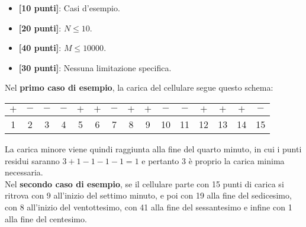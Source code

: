 \begin{itemize}[nolistsep,itemsep=2mm]
  \item \textbf{ [10 punti]}: Casi d'esempio.
  \item \textbf{ [20 punti]}: $N \leq 10$.
  \item \textbf{ [40 punti]}: $M \leq 10000$.
  \item \textbf{ [30 punti]}: Nessuna limitazione specifica.
\end{itemize}



\Examples
\begin{example}
%
%
\end{example}


\Explanation
Nel \textbf{primo caso di esempio}, la carica del cellulare segue questo schema:
\begin{center}
\begin{tabular}{ccccccccccccccc}
	\hline
	\multicolumn{1}{|c|}{$+$} & \multicolumn{1}{c|}{$-$} & \multicolumn{1}{c|}{$-$} & \multicolumn{1}{c|}{$-$} & \multicolumn{1}{c|}{$+$} & \multicolumn{1}{c|}{$+$} & \multicolumn{1}{c|}{$-$} & \multicolumn{1}{c|}{$+$} & \multicolumn{1}{c|}{$+$} & \multicolumn{1}{c|}{$-$} & \multicolumn{1}{c|}{$-$} & \multicolumn{1}{c|}{$+$} & \multicolumn{1}{c|}{$+$} & \multicolumn{1}{c|}{$+$} & \multicolumn{1}{c|}{$-$} \\
	\hline
	1 & 2 & 3 & 4 & 5 & 6 & 7 & 8 & 9 & 10 & 11 & 12 & 13 & 14 & 15 \\
\end{tabular}
\end{center}
La carica minore viene quindi raggiunta alla fine del quarto minuto, in cui i punti residui saranno $3 + 1 - 1 - 1 - 1 = 1$ e pertanto 3 è proprio la carica minima necessaria.\\[2mm]
Nel \textbf{secondo caso di esempio}, se il cellulare parte con 15 punti di carica si ritrova con 9 all'inizio del settimo minuto, e poi con 19 alla fine del sedicesimo, con 8 all'inizio del ventottesimo, con 41 alla fine del sessantesimo e infine con 1 alla fine del centesimo.
